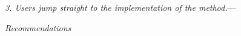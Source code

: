 \documentclass[a4paper,12pt]{article}
\renewcommand{\subsection}[1]{%
\bigskip
\begin{center}
\begin{large}
\normalfont\itshape #1
\end{large}
\end{center}}
\renewcommand{\subsubsection}[1]{%
\vspace{2ex}
\noindent
\textit{#1.}---}
\begin{document}
\subsubsection{3. Users jump straight to the implementation of the method}





\subsection{Recommendations}

\end{document}

